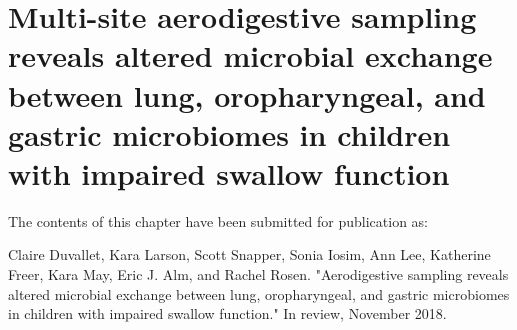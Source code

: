 
\chapter{Multi-site aerodigestive sampling reveals altered microbial exchange between lung, oropharyngeal, and gastric microbiomes in children with impaired swallow function}

The contents of this chapter have been submitted for publication as:

Claire Duvallet, Kara Larson, Scott Snapper, Sonia Iosim, Ann Lee, Katherine Freer, Kara May, Eric J. Alm, and Rachel Rosen. "Aerodigestive sampling reveals altered microbial exchange between lung, oropharyngeal, and gastric microbiomes in children with impaired swallow function." In review, November 2018.
